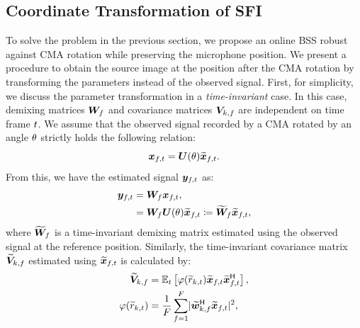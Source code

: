 \documentclass[sip,biber]{now-journal}
\begin{document}
\subsection{Coordinate Transformation of SFI}

To solve the problem in the previous section, we propose an online BSS robust against CMA rotation while preserving the microphone position.
We present a procedure to obtain the source image at the position after the CMA rotation by transforming the parameters instead of the observed signal.
First, for simplicity, we discuss the parameter transformation in a \emph{time-invariant} case.
In this case, demixing matrices $\bm{W} _{f}$ and covariance matrices $\bm{V} _{k,f}$ are independent on time frame $t$.
We assume that the observed signal recorded by a CMA rotated by an angle $\theta$ strictly holds the following relation:
\begin{equation}
  \Obs _{\ft} = \rotMat (\rotSpat) \refpos{\Obs} _{\ft}.
\end{equation}
From this, we have the estimated signal $\Est _{\ft}$ as:
\begin{align}
  \Est _{\ft} &= \Demix _{\freq} \Obs _{\ft}, \\
              &= \Demix _{\freq} \rotMat (\rotSpat) \refpos{\Obs} _{\ft} \coloneqq \refpos{\Demix} _{\freq} \refpos{\Obs} _{\ft}, \label{eq:rt:demix:batch}
\end{align}
where $\widetilde{\bm{W}} _{f}$ is a time-invariant demixing matrix estimated using the observed signal at the reference position.
Similarly, the time-invariant covariance matrix $\widetilde{\bm{V}} _{k,f}$ estimated using $\refpos{\Obs} _{\ft}$ is calculated by:
\begin{align}
  \refpos{\cov} _{\src,\freq} &= \expct  _{\tframe} \left[\weight (\refpos{\var} _{\src,\tframe}) \refpos{\Obs} _{\ft} \refpos{\Obs} _{\ft} ^{\hermite}\right], \\
  \weight (\refpos{\var} _{\src,\tframe}) &= \frac{1}{\Freq} \sum _{\freq = 1} ^{\Freq} \lvert \refpos{\demix} _{\src,\freq} ^{\hermite} \refpos{\Obs} _{\ft} \rvert ^2,
\end{align}
\end{document}
